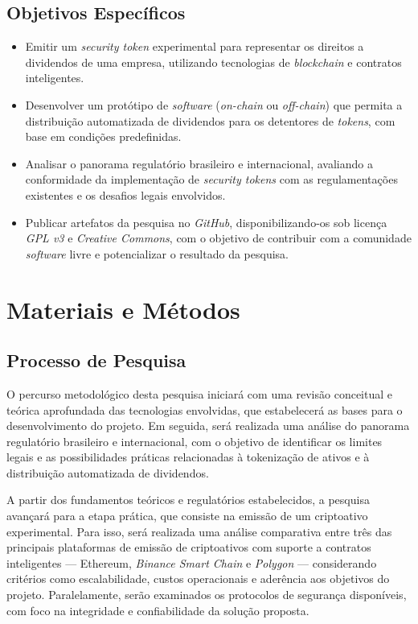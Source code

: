 \documentclass[12pt, a4paper, oneside, openright, chapter=TITLE]{abntex2}
\begin{document}
\subsection{Objetivos Específicos}
\begin{itemize}
    \item Emitir um \textit{security token} experimental para representar os direitos a dividendos de uma empresa, utilizando tecnologias de \textit{blockchain} e contratos inteligentes.

    \item Desenvolver um protótipo de \textit{software} (\textit{on-chain} ou \textit{off-chain}) que permita a distribuição automatizada de dividendos para os detentores de \textit{tokens}, com base em condições predefinidas.
    
    \item Analisar o panorama regulatório brasileiro e internacional, avaliando a conformidade da implementação de \textit{security tokens} com as regulamentações existentes e os desafios legais envolvidos.
    
    \item Publicar artefatos da pesquisa no \textit{GitHub}, disponibilizando-os sob licença \textit{GPL v3} e \textit{Creative Commons}, com o objetivo de contribuir com a comunidade \textit{software} livre e potencializar o resultado da pesquisa.
\end{itemize}

\clearpage
\section{Materiais e Métodos}
\subsection{Processo de Pesquisa}
\hspace*{\parindent} O percurso metodológico desta pesquisa iniciará com uma revisão conceitual e teórica aprofundada das tecnologias envolvidas, que estabelecerá as bases para o desenvolvimento do projeto. Em seguida, será realizada uma análise do panorama regulatório brasileiro e internacional,  com o objetivo de identificar os limites legais e as possibilidades práticas relacionadas à tokenização de ativos e à distribuição automatizada de dividendos.

A partir dos fundamentos teóricos e regulatórios estabelecidos, a pesquisa avançará para a etapa prática, que consiste na emissão de um criptoativo experimental. Para isso, será realizada uma análise comparativa entre três das principais plataformas de emissão de criptoativos com suporte a contratos inteligentes — Ethereum, \textit{Binance Smart Chain} e \textit{Polygon} — considerando critérios como escalabilidade, custos operacionais e aderência aos objetivos do projeto. Paralelamente, serão examinados os protocolos de segurança disponíveis, com foco na integridade e confiabilidade da solução proposta.
\end{document}
